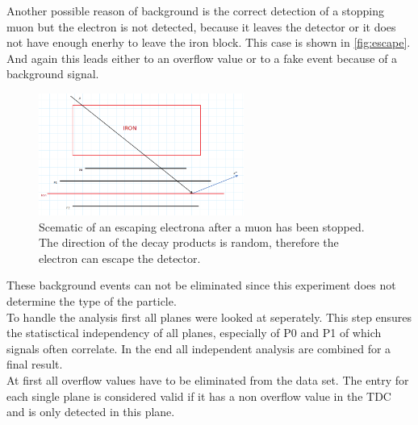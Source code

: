 Another possible reason of background is the correct detection of a stopping muon but the electron 
is not detected, because it leaves the detector or it does not have enough enerhy to leave 
the iron block. This case is shown in \autoref{fig:escape}. And again this leads 
either to an overflow value or to a fake event because of a background signal.
\begin{figure}
    \centering
    \includegraphics[width=0.6\textwidth]{figures/electron_escape.png}
    \caption{Scematic of an escaping electrona after a muon has been stopped. The direction of the decay products is random, therefore the electron can escape the detector.}
    \label{fig:escape}
\end{figure}
These background events can not be eliminated since this experiment does not determine the type of the particle.\\
To handle the analysis first all planes were looked at seperately. This step ensures the statisctical 
independency of all planes, especially of P0 and P1 of which signals often correlate. In the end 
all independent analysis are combined for a final result.\\
At first all overflow values have to be eliminated from the data set. The entry for each single plane 
is considered valid if it has a non overflow value in the TDC and is only detected in this plane.
